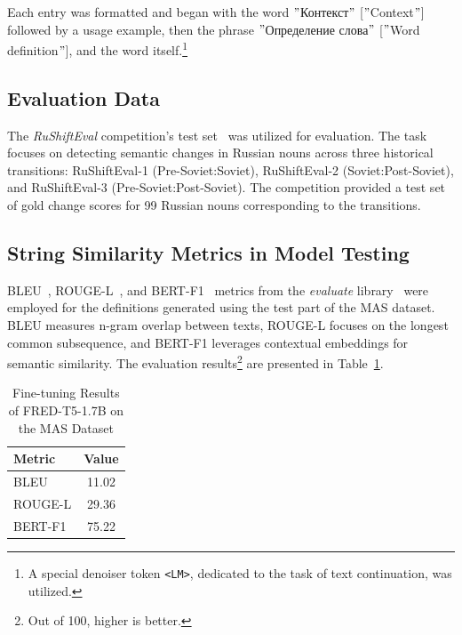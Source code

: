 \documentclass[11pt]{article}
\begin{document}
Each entry was formatted and began with the word \("\)Контекст\("\) [\("\)Context\("\)] followed by a usage example, then the phrase \("\)Определение слова\("\) [\("\)Word definition\("\)], and the word itself.\footnote{A special denoiser token \texttt{<LM>}, dedicated to the task of text continuation, was utilized.}

\subsection{Evaluation Data}

The \textit{RuShiftEval} competition's test set~\cite{rushifteval} was utilized for evaluation.
The task focuses on detecting semantic changes in Russian nouns across three historical transitions:
RuShiftEval-1 (Pre-Soviet:Soviet), RuShiftEval-2 (Soviet:Post-Soviet), and RuShiftEval-3 (Pre-Soviet:Post-Soviet).
The competition provided a test set of gold change scores for 99 Russian nouns corresponding to the transitions.

\subsection{String Similarity Metrics in Model Testing}

BLEU~\cite{BLEUScore}, ROUGE-L~\cite{ROUGE}, and BERT-F1~\cite{BERTScore} metrics from the \textit{evaluate} library~\cite{Evaluate} were employed for the definitions generated using the test part of the MAS dataset.
BLEU measures n-gram overlap between texts, ROUGE-L focuses on the longest common subsequence,
and BERT-F1 leverages contextual embeddings for semantic similarity.
The evaluation results\footnote{Out of 100, higher is better.} are presented in Table~\ref{tab:Similarity_metrics}.

\begin{table}[H]
\centering
\caption{Fine-tuning Results of FRED-T5-1.7B on the MAS Dataset}
\label{tab:Similarity_metrics}
\begin{tabular}{|l|c|}
\hline
\textbf{Metric}                  & \textbf{Value} \\
\hline
BLEU            & 11.02                  \\
\hline
ROUGE-L           & 29.36                  \\
\hline
BERT-F1          & 75.22                  \\
\hline
\end{tabular}
\end{table}
\end{document}

